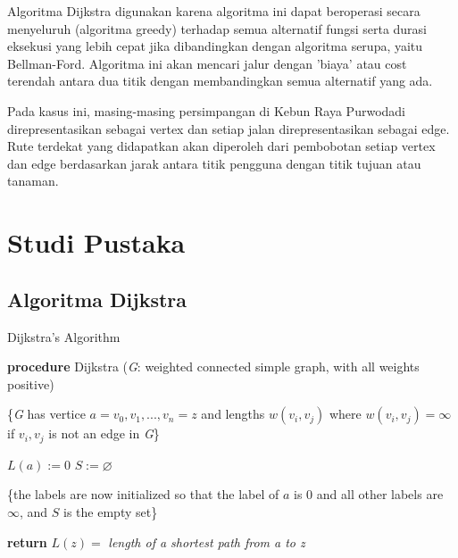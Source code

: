 \documentclass[conference]{IEEEtran}
\begin{document}
Algoritma Dijkstra digunakan karena algoritma ini dapat beroperasi secara menyeluruh (algoritma greedy) terhadap semua alternatif fungsi serta durasi eksekusi yang lebih cepat jika dibandingkan dengan algoritma serupa, yaitu Bellman-Ford. Algoritma ini akan mencari jalur dengan 'biaya' atau cost terendah antara dua titik dengan membandingkan semua alternatif yang ada.

Pada kasus ini, masing-masing persimpangan di Kebun Raya Purwodadi direpresentasikan sebagai vertex dan setiap jalan direpresentasikan sebagai edge. Rute terdekat yang didapatkan akan diperoleh dari pembobotan setiap vertex dan edge berdasarkan jarak antara titik pengguna dengan titik tujuan atau tanaman.

\section{Studi Pustaka}

\subsection{Algoritma Dijkstra}
\begin{algorithm}
    \caption{Dijkstra's Algorithm}
    \SetAlgoLined
    \DontPrintSemicolon
   
    \textbf{procedure} Dijkstra (\textit{G}: weighted connected simple graph, with all weights positive)
    
    \{\textit{G} has vertice $a = v_0, v_1, ..., v_n = z$ and lengths $w(v_i, v_j)$ where $w(v_i, v_j) = \infty$ if $v_i, v_j$ is not an edge in \textit{G}\}
    
    $L(a) := 0$\;
    $S := \varnothing$

    \{the labels are now initialized so that the label of $a$ is 0 and all other labels are $\infty$, and $S$ is the empty set\}

    \textbf{return} $L(z)=$ \textit{length of a shortest path from a to z}
    
\end{algorithm}
\end{document}
